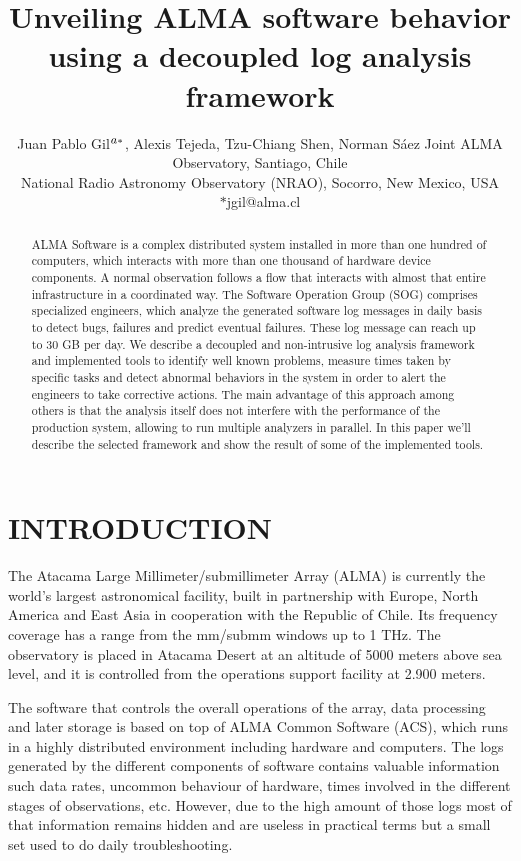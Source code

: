 \documentclass[]{spie}  %
\title{Unveiling ALMA software behavior using a decoupled log analysis framework}
\author{Juan Pablo Gil$\supit{a}^{*}$, Alexis Tejeda\supit{b}, Tzu-Chiang Shen\supit{a}, Norman S\'aez\supit{a}
\skiplinehalf
\supit{a}Joint ALMA Observatory, Santiago, Chile\\
\supit{b}National Radio Astronomy Observatory (NRAO), Socorro, New Mexico, USA\\ $*$jgil@alma.cl
}
\begin{document}
 
  \maketitle 

\begin{abstract}
ALMA Software is a complex distributed system installed in more than one
hundred of computers, which interacts with more than one thousand of hardware
device components. A normal observation follows a flow that interacts with
almost that entire infrastructure in a coordinated way. The Software Operation
Group (SOG) comprises specialized engineers, which analyze the generated
software log messages in daily basis to detect bugs, failures and predict
eventual failures. These log message can reach up to 30 GB per day. We describe
a decoupled and non-intrusive log analysis framework and implemented tools to
identify well known problems, measure times taken by specific tasks and detect
abnormal behaviors in the system in order to alert the engineers to take
corrective actions. The main advantage of this approach among others is that
the analysis itself does not interfere with the performance of the production
system, allowing to run multiple analyzers in parallel. In this paper we'll
describe the selected framework and show the result of some of the implemented
tools.\cite{basden2010durham}
\end{abstract}



\section{INTRODUCTION}\label{sec:intro}  %
The Atacama Large Millimeter/submillimeter Array (ALMA) is currently the
world’s largest astronomical facility, built in partnership with Europe,
    North America and East Asia in cooperation with the Republic of Chile. Its
    frequency coverage has a range from the mm/submm windows up to 1 THz. The
    observatory is placed in Atacama Desert at an altitude of 5000 meters above
    sea level, and it is controlled from the operations support facility at
    2.900 meters.

The software that controls the overall operations of the array, data processing
and later storage is based on top of ALMA Common Software (ACS), which runs in
a highly distributed environment including hardware and computers. The logs
generated by the different components of software contains valuable information
such data rates, uncommon behaviour of hardware, times involved in the
different stages of observations, etc. However, due to the high amount of those
logs most of that information remains hidden and are useless in practical terms
but a small set used to do daily troubleshooting.
\end{document}
